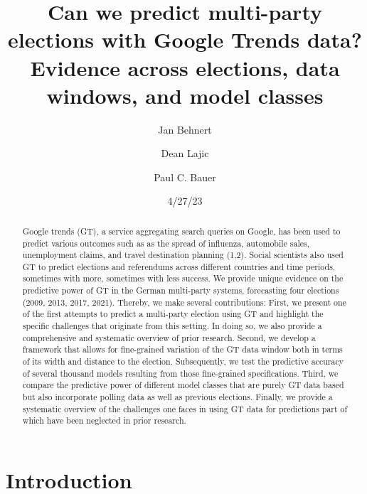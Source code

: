 \documentclass[
  letterpaper,
  DIV=11,
  numbers=noendperiod]{scrartcl}
\title{Can we predict multi-party elections with Google Trends data?
Evidence across elections, data windows, and model classes}
\author{Jan Behnert \and Dean Lajic \and Paul C. Bauer}
\date{4/27/23}
\renewcommand*\contentsname{Table of contents}
\newcommand\contentsname{Table of contents}
\begin{document}
\maketitle
\begin{abstract}
Google trends (GT), a service aggregating search queries on Google, has
been used to predict various outcomes such as as the spread of
influenza, automobile sales, unemployment claims, and travel destination
planning (1,2). Social scientists also used GT to predict elections and
referendums across different countries and time periods, sometimes with
more, sometimes with less success. We provide unique evidence on the
predictive power of GT in the German multi-party systems, forecasting
four elections (2009, 2013, 2017, 2021). Thereby, we make several
contributions: First, we present one of the first attempts to predict a
multi-party election using GT and highlight the specific challenges that
originate from this setting. In doing so, we also provide a
comprehensive and systematic overview of prior research. Second, we
develop a framework that allows for fine-grained variation of the GT
data window both in terms of its width and distance to the election.
Subsequently, we test the predictive accuracy of several thousand models
resulting from those fine-grained specifications. Third, we compare the
predictive power of different model classes that are purely GT data
based but also incorporate polling data as well as previous elections.
Finally, we provide a systematic overview of the challenges one faces in
using GT data for predictions part of which have been neglected in prior
research.
\end{abstract}
\ifdefined\Shaded\renewenvironment{Shaded}{\begin{tcolorbox}[frame hidden, enhanced, sharp corners, boxrule=0pt, breakable, borderline west={3pt}{0pt}{shadecolor}, interior hidden]}{\end{tcolorbox}}\fi

\renewcommand*\contentsname{Table of contents}
{
\hypersetup{linkcolor=}
\setcounter{tocdepth}{3}
\tableofcontents
}
\newpage

\hypertarget{introduction}{%
\section{Introduction}\label{introduction}}
\end{document}
